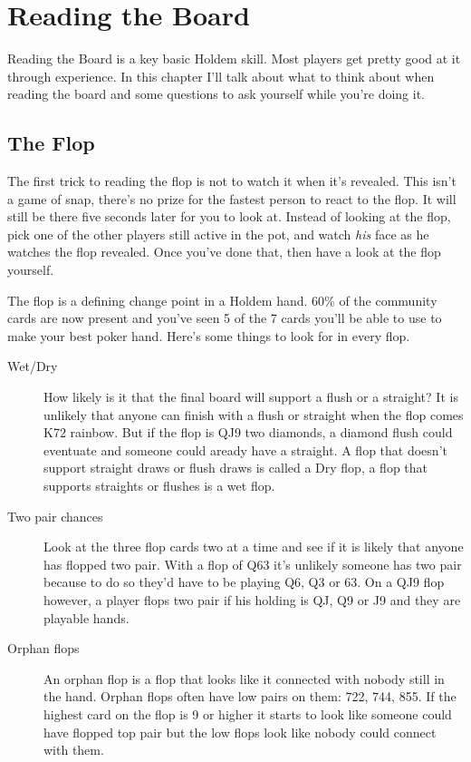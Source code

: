 \chapter{Reading the Board}

Reading the Board is a key basic Holdem skill. Most players get
pretty good at it through experience. In this chapter I'll talk about
what to think about when reading the board and some questions to ask
yourself while you're doing it.

\section{The Flop}

The first trick to reading the flop is not to watch it when it's
revealed. This isn't a game of snap, there's no prize for the fastest
person to react to the flop. It will still be there five seconds later
for you to look at. Instead of looking at the flop, pick one of the
other players still active in the pot, and watch \textit{his} face as
he watches the flop revealed. Once you've done that, then have a look
at the flop yourself.

The flop is a defining change point in a Holdem hand. 60\% of the
community cards are now present and you've seen 5 of the 7 cards
you'll be able to use to make your best poker hand. Here's some things
to look for in every flop.

\begin{description}

\item[Wet/Dry] How likely is it that the final board will support a
flush or a straight? It is unlikely that anyone can finish with a
flush or straight when the flop comes K72 rainbow. But if the flop is
QJ9 two diamonds, a diamond flush could eventuate and someone could
aready have a straight. A flop that doesn't support straight draws or
flush draws is called a Dry flop, a flop that supports straights or
flushes is a wet flop.

\item[Two pair chances] Look at the three flop cards two at a time and
see if it is likely that anyone has flopped two pair. With a flop of
Q63 it's unlikely someone has two pair because to do so they'd have to
be playing Q6, Q3 or 63. On a QJ9 flop however, a player flops two
pair if his holding is QJ, Q9 or J9 and they are playable hands.

\item[Orphan flops] An orphan flop is a flop that looks like it
connected with nobody still in the hand. Orphan flops often have low
pairs on them: 722, 744, 855. If the highest card on the flop is 9 or
higher it starts to look like someone could have flopped top pair but
the low flops look like nobody could connect with them.

\end{description}
